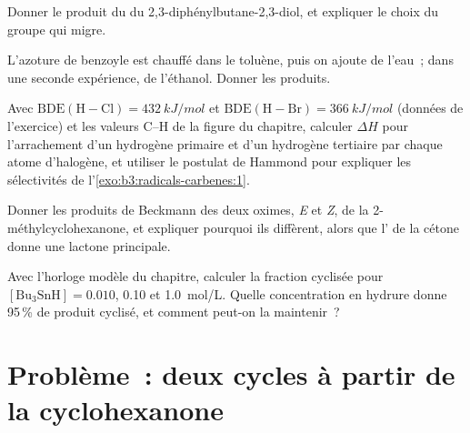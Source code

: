 \begin{exercise}[$\star\star$]\label{exo:b3:radicals-carbenes:8}
Donner le produit du  du
2,3-diphénylbutane-2,3-diol, et expliquer le choix du groupe qui migre.
\end{exercise}

\begin{exercise}[$\star\star$]\label{exo:b3:radicals-carbenes:9}
L'azoture de benzoyle est chauffé dans le toluène, puis on ajoute de
l'eau~; dans une seconde expérience, de l'éthanol. Donner les produits.
\end{exercise}

\begin{exercise}[$\star\star\star$]\label{exo:b3:radicals-carbenes:10}
Avec $\mathrm{BDE(H{-}Cl)} = \qty{432}{kJ/mol}$ et $\mathrm{BDE(H{-}Br)} = \qty{366}{kJ/mol}$ (données de l'exercice) et les valeurs C--H de
la figure du chapitre, calculer $\Delta H$ pour l'arrachement d'un hydrogène primaire et d'un hydrogène tertiaire
par chaque atome d'halogène, et utiliser le postulat de Hammond pour
expliquer les sélectivités de l'\cref{exo:b3:radicals-carbenes:1}.
\end{exercise}

\begin{exercise}[$\star\star\star$]\label{exo:b3:radicals-carbenes:11}
Donner les produits de Beckmann des deux oximes, \textit{E} et \textit{Z}, de la 2-méthylcyclohexanone,
et expliquer pourquoi ils diffèrent, alors que l' de la cétone donne une lactone principale.
\end{exercise}

\begin{exercise}[$\star\star\star$]\label{exo:b3:radicals-carbenes:12}
Avec l'horloge modèle du chapitre, calculer la fraction cyclisée pour $[\mathrm{Bu_3SnH}] = 0.010$,
0.10 et \qty{1.0}{mol/L}. Quelle concentration en hydrure donne 95\,\% de produit cyclisé, et comment
peut-on la maintenir~?
\end{exercise}

\section{Problème~: deux cycles à partir de la cyclohexanone}

